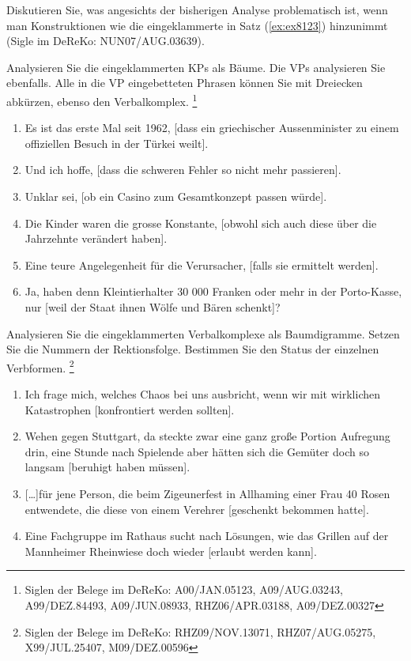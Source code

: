 \begin{sloppypar}
\Uebung[\tristar] \label{u113} Diskutieren Sie, was angesichts der bisherigen Analyse problematisch ist, wenn man Konstruktionen wie die eingeklammerte in Satz (\ref{ex:ex8123}) hinzunimmt (Sigle im DeReKo: NUN07\slash AUG.03639).

\begin{exe}
\end{exe}

\Uebung \label{u114} Analysieren Sie die eingeklammerten KPs als Bäume.
Die VPs analysieren Sie ebenfalls.
Alle in die VP eingebetteten Phrasen können Sie mit Dreiecken abkürzen, ebenso den Verbalkomplex.%
\footnote{Siglen der Belege im DeReKo: A00\slash JAN.05123, A09\slash AUG.03243, A99\slash DEZ.84493, A09\slash JUN.08933, RHZ06\slash APR.03188, A09\slash DEZ.00327}

\begin{enumerate}\Lf
  \item Es ist das erste Mal seit 1962, [dass ein griechischer Aussenminister zu einem offiziellen Besuch in der Türkei weilt].
  \item Und ich hoffe, [dass die schweren Fehler so nicht mehr passieren].
  \item Unklar sei, [ob ein Casino zum Gesamtkonzept passen würde].
  \item Die Kinder waren die grosse Konstante, [obwohl sich auch diese über die Jahrzehnte verändert haben].
  \item Eine teure Angelegenheit für die Verursacher, [falls sie ermittelt werden].
  \item Ja, haben denn Kleintierhalter 30 000 Franken oder mehr in der Porto-Kasse, nur [weil der Staat ihnen Wölfe und Bären schenkt]?
\end{enumerate}

\Uebung \label{u115} Analysieren Sie die eingeklammerten Verbalkomplexe als Baumdigramme.
Setzen Sie die Nummern der Rektionsfolge.
Bestimmen Sie den Status der einzelnen Verbformen.%
\footnote{Siglen der Belege im DeReKo: RHZ09\slash NOV.13071, RHZ07\slash AUG.05275, X99\slash JUL.25407, M09\slash DEZ.00596}

\begin{enumerate}\Lf
  \item Ich frage mich, welches Chaos bei uns ausbricht, wenn wir mit wirklichen Katastrophen [konfrontiert werden sollten].
  \item Wehen gegen Stuttgart, da steckte zwar eine ganz große Portion Aufregung drin, eine Stunde nach Spielende aber hätten sich die Gemüter doch so langsam [beruhigt haben müssen].
  \item{} [\ldots]für jene Person, die beim Zigeunerfest in Allhaming einer Frau 40 Rosen entwendete, die diese von einem Verehrer [geschenkt bekommen hatte].
  \item Eine Fachgruppe im Rathaus sucht nach Lösungen, wie das Grillen auf der Mannheimer Rheinwiese doch wieder [erlaubt werden kann].
\end{enumerate}

\end{sloppypar}
